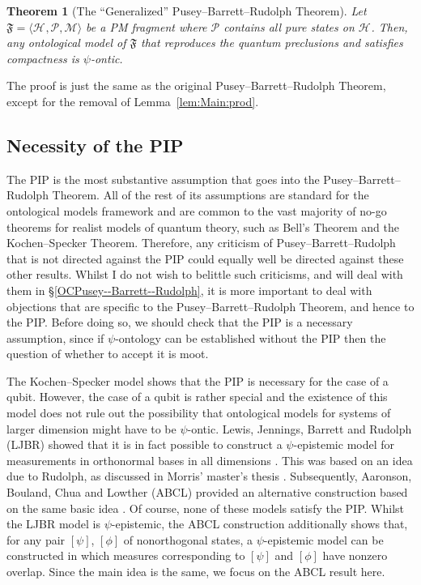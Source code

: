 \documentclass[DIV=calc,fontsize=12pt]{scrartcl} %
\theoremstyle{definition}
\theoremstyle{plain}
\newtheorem{theorem}[definition]{Theorem}
\newcommand{\Proj}[1]{\ensuremath{\left [ #1 \right ]}}
\newcommand{\Hilb}[1][]{\ensuremath{\mathcal{H}_{#1}}}
\begin{document}
\begin{theorem}[The ``Generalized'' Pusey--Barrett--Rudolph Theorem]
\label{thm:Main:Pusey--Barrett--RudolphGen}
Let $\mathfrak{F} = \langle \Hilb, \mathcal{P}, \mathcal{M} \rangle$
be a PM fragment where $\mathcal{P}$ contains all
pure states on $\Hilb$.  Then, any ontological model of
$\mathfrak{F}$ that reproduces the quantum preclusions and satisfies
compactness is $\psi$-ontic.
\end{theorem}

The proof is just the same as the original Pusey--Barrett--Rudolph Theorem, except for the
removal of Lemma~\ref{lem:Main:prod}.

\subsection{Necessity of the PIP}

\label{NPIP}

The PIP is the most substantive assumption that goes into the
Pusey--Barrett--Rudolph Theorem.  All of the rest of its assumptions
are standard for the ontological models framework and are common to
the vast majority of no-go theorems for realist models of quantum
theory, such as Bell's Theorem and the Kochen--Specker Theorem.
Therefore, any criticism of Pusey--Barrett--Rudolph that is not
directed against the PIP could equally well be directed against these
other results.  Whilst I do not wish to belittle such criticisms, and
will deal with them in \S\ref{OCPusey--Barrett--Rudolph}, it is more
important to deal with objections that are specific to the
Pusey--Barrett--Rudolph Theorem, and hence to the PIP\@.  Before doing
so, we should check that the PIP is a necessary assumption, since if
$\psi$-ontology can be established without the PIP then the question
of whether to accept it is moot.

The Kochen--Specker model shows that the PIP is necessary for the case
of a qubit.  However, the case of a qubit is rather special and the
existence of this model does not rule out the possibility that
ontological models for systems of larger dimension might have to be
$\psi$-ontic.  Lewis, Jennings, Barrett and Rudolph (LJBR) showed that
it is in fact possible to construct a $\psi$-epistemic model for
measurements in orthonormal bases in all dimensions \cite{Lewis2012}.
This was based on an idea due to Rudolph, as discussed in Morris'
master's thesis \cite{Morris2009}.  Subsequently, Aaronson, Bouland,
Chua and Lowther (ABCL) provided an alternative construction based on
the same basic idea \cite{Aaronson2013}.  Of course, none of these
models satisfy the PIP\@.  Whilst the LJBR model is $\psi$-epistemic,
the ABCL construction additionally shows that, for any pair
$\Proj{\psi}$, $\Proj{\phi}$ of nonorthogonal states, a
$\psi$-epistemic model can be constructed in which measures
corresponding to $\Proj{\psi}$ and $\Proj{\phi}$ have nonzero overlap.
Since the main idea is the same, we focus on the ABCL result here.
\end{document}
